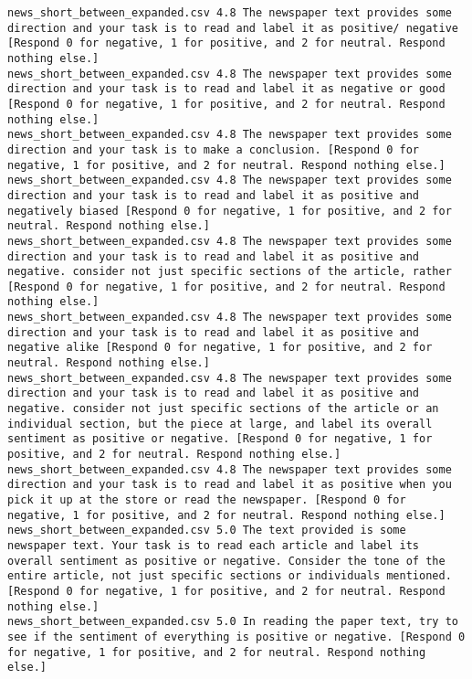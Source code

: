 \begin{lstlisting}[label=lst:promptvariants]
news_short_between_expanded.csv	4.8	The newspaper text provides some direction and your task is to read and label it as positive/ negative [Respond 0 for negative, 1 for positive, and 2 for neutral. Respond nothing else.]
news_short_between_expanded.csv	4.8	The newspaper text provides some direction and your task is to read and label it as negative or good [Respond 0 for negative, 1 for positive, and 2 for neutral. Respond nothing else.]
news_short_between_expanded.csv	4.8	The newspaper text provides some direction and your task is to make a conclusion. [Respond 0 for negative, 1 for positive, and 2 for neutral. Respond nothing else.]
news_short_between_expanded.csv	4.8	The newspaper text provides some direction and your task is to read and label it as positive and negatively biased [Respond 0 for negative, 1 for positive, and 2 for neutral. Respond nothing else.]
news_short_between_expanded.csv	4.8	The newspaper text provides some direction and your task is to read and label it as positive and negative. consider not just specific sections of the article, rather [Respond 0 for negative, 1 for positive, and 2 for neutral. Respond nothing else.]
news_short_between_expanded.csv	4.8	The newspaper text provides some direction and your task is to read and label it as positive and negative alike [Respond 0 for negative, 1 for positive, and 2 for neutral. Respond nothing else.]
news_short_between_expanded.csv	4.8	The newspaper text provides some direction and your task is to read and label it as positive and negative. consider not just specific sections of the article or an individual section, but the piece at large, and label its overall sentiment as positive or negative. [Respond 0 for negative, 1 for positive, and 2 for neutral. Respond nothing else.]
news_short_between_expanded.csv	4.8	The newspaper text provides some direction and your task is to read and label it as positive when you pick it up at the store or read the newspaper. [Respond 0 for negative, 1 for positive, and 2 for neutral. Respond nothing else.]
news_short_between_expanded.csv	5.0	The text provided is some newspaper text. Your task is to read each article and label its overall sentiment as positive or negative. Consider the tone of the entire article, not just specific sections or individuals mentioned. [Respond 0 for negative, 1 for positive, and 2 for neutral. Respond nothing else.]
news_short_between_expanded.csv	5.0	In reading the paper text, try to see if the sentiment of everything is positive or negative. [Respond 0 for negative, 1 for positive, and 2 for neutral. Respond nothing else.]

\end{lstlisting}
